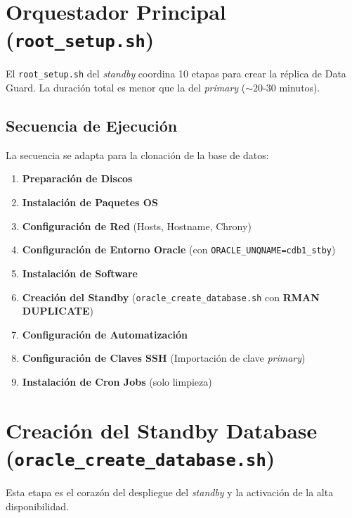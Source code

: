 \documentclass[11pt, a4paper]{report}
\begin{document}
\section{Orquestador Principal (\texttt{root\_setup.sh})}

El \texttt{root\_setup.sh} del \textit{standby} coordina 10 etapas para crear la réplica de Data Guard.
La duración total es menor que la del \textit{primary} ($\sim 20$-$30$ minutos).
\subsection{Secuencia de Ejecución}
La secuencia se adapta para la clonación de la base de datos:
\begin{enumerate}
    \item \textbf{Preparación de Discos}
    \item \textbf{Instalación de Paquetes OS}
    \item \textbf{Configuración de Red} (Hosts, Hostname, Chrony)
    \item \textbf{Configuración de Entorno Oracle} (con \texttt{ORACLE\_UNQNAME=cdb1\_stby})
    \item \textbf{Instalación de Software}
    \item \textbf{Creación del Standby} (\texttt{oracle\_create\_database.sh} con \textbf{RMAN DUPLICATE})
    \item \textbf{Configuración de Automatización}
    \item \textbf{Configuración de Claves SSH} (Importación de clave \textit{primary})
    \item \textbf{Instalación de Cron Jobs} (solo limpieza)
\end{enumerate}

\section{Creación del Standby Database (\texttt{oracle\_create\_database.sh})}

Esta etapa es el corazón del despliegue del \textit{standby} y la activación de la alta disponibilidad.
\end{document}
